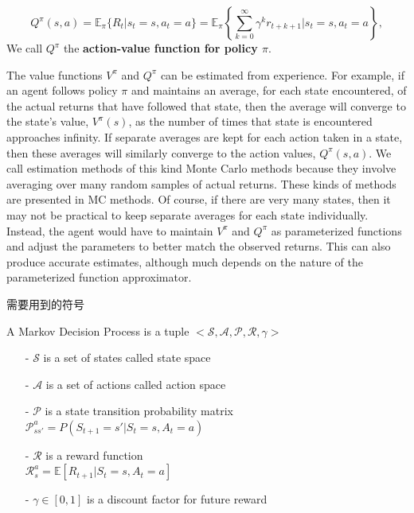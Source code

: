 \begin{equation}\label{rl-policy-action-value}
Q^\pi(s, a) = \mathbb{E}_\pi\{R_t|s_t = s, a_t = a\} = 
\mathbb{E}_\pi\left\{ \sum_{k=0}^\infty\gamma^k r_{t+k+1} | s_t = s, a_t = a \right\},
\end{equation}
We call $Q^\pi$ the {\bf action-value function for policy $\pi$}.

The value functions $V^\pi$ and $Q^\pi$ can be estimated from experience. For example, 
if an agent follows policy $\pi$ and maintains an average, for each state encountered, 
of the actual returns that have followed that state, then the average will converge to 
the state's value, $V^\pi(s)$, as the number of times that state is encountered 
approaches infinity. If separate averages are kept for each action taken in a state, 
then these averages will similarly converge to the action values, $Q^\pi(s,a)$. We call 
estimation methods of this kind Monte Carlo methods because they involve averaging over 
many random samples of actual returns. These kinds of methods are presented in MC methods. 
Of course, if there are very many states, then it may not be practical to keep separate 
averages for each state individually. Instead, the agent would have to maintain $V^\pi$ 
and $Q^\pi$ as parameterized functions and adjust the parameters to better match the 
observed returns. This can also produce accurate estimates, although much depends on 
the nature of the parameterized function approximator.

\begin{emp_box}
需要用到的符号

A Markov Decision Process is a tuple $<\mathcal{S}, \mathcal{A}, \mathcal{P}, 
\mathcal{R}, \gamma>$
\begin{itemize}
\setlength{\parskip}{0pt}
\item[-]
$\mathcal{S}$ is a set of states called state space

\item[-]
$\mathcal{A}$ is a set of actions called action space

\item[-]
$\mathcal{P}$ is a state transition probability matrix \\
$\mathcal{P}^a_{ss'}=P(S_{t+1}=s'|S_t=s,A_t=a)$

\item[-]
$\mathcal{R}$ is a reward function \\
$ \mathcal{R}^a_s=\mathbb{E}\left[R_{t+1}|S_t=s,A_t=a\right]$

\item[-]
$\gamma\in[0, 1]$ is a discount factor for future reward
\end{itemize}

\end{emp_box}

